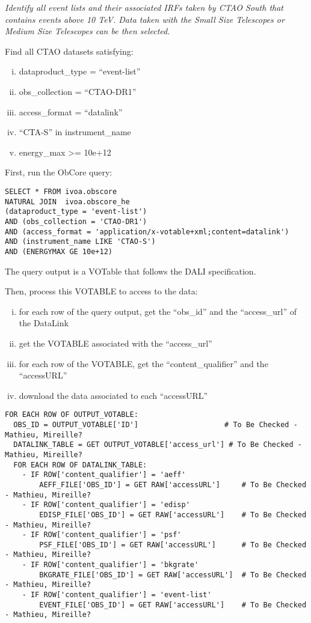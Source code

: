 {\em Identify all event lists and their associated \glspl{IRF} taken by CTAO South that contains events above 10 TeV. Data taken with the Small Size Telescopes or Medium Size Telescopes can be then selected. \/}

\medskip
\noindent Find all CTAO datasets satisfying:
\begin{enumerate}[(i)]
  \item dataproduct\_type = ``event-list''
  \item obs\_collection = ``CTAO-DR1''
  \item access\_format = ``datalink''
  \item ``CTA-S'' in instrument\_name
  \item energy\_max >= 10e+12
\end{enumerate}

First, run the ObCore query:
\begin{verbatim}
SELECT * FROM ivoa.obscore
NATURAL JOIN  ivoa.obscore_he
(dataproduct_type = 'event-list')
AND (obs_collection = 'CTAO-DR1')
AND (access_format = 'application/x-votable+xml;content=datalink')
AND (instrument_name LIKE 'CTAO-S')
AND (ENERGYMAX GE 10e+12)
\end{verbatim}
The query output is a VOTable that follows the DALI specification. 

\medskip
\noindent Then, process this VOTABLE to access to the data:
\begin{enumerate}[(i)]
  \item for each row of the query output, get the ``obs\_id'' and the ``access\_url'' of the DataLink
  \item get the VOTABLE associated with the ``access\_url''
  \item for each row of the VOTABLE, get the ``content\_qualifier'' and the ``accessURL''
  \item download the data associated to each ``accessURL''
\end{enumerate}

\begin{verbatim}
FOR EACH ROW OF OUTPUT_VOTABLE:
  OBS_ID = OUTPUT_VOTABLE['ID']                    # To Be Checked - Mathieu, Mireille?
  DATALINK_TABLE = GET OUTPUT_VOTABLE['access_url'] # To Be Checked - Mathieu, Mireille?
  FOR EACH ROW OF DATALINK_TABLE:
    - IF ROW['content_qualifier'] = 'aeff'
    	AEFF_FILE['OBS_ID'] = GET RAW['accessURL']     # To Be Checked - Mathieu, Mireille?
    - IF ROW['content_qualifier'] = 'edisp'
    	EDISP_FILE['OBS_ID'] = GET RAW['accessURL']    # To Be Checked - Mathieu, Mireille?
    - IF ROW['content_qualifier'] = 'psf'
    	PSF_FILE['OBS_ID'] = GET RAW['accessURL']      # To Be Checked - Mathieu, Mireille?
    - IF ROW['content_qualifier'] = 'bkgrate'
    	BKGRATE_FILE['OBS_ID'] = GET RAW['accessURL']  # To Be Checked - Mathieu, Mireille?
    - IF ROW['content_qualifier'] = 'event-list'
    	EVENT_FILE['OBS_ID'] = GET RAW['accessURL']    # To Be Checked - Mathieu, Mireille?
\end{verbatim}



